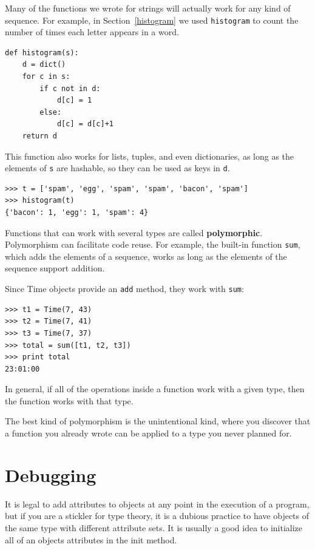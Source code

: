 \documentclass[10pt]{book}
\begin{document}

Many of the functions we wrote for strings will actually
work for any kind of sequence.
For example, in Section~\ref{histogram}
we used {\tt histogram} to count the number of times each letter
appears in a word.

\beforeverb
\begin{verbatim}
def histogram(s):
    d = dict()
    for c in s:
        if c not in d:
            d[c] = 1
        else:
            d[c] = d[c]+1
    return d
\end{verbatim}
\afterverb
%
This function also works for lists, tuples, and even dictionaries,
as long as the elements of {\tt s} are hashable, so they can be used
as keys in {\tt d}.

\beforeverb
\begin{verbatim}
>>> t = ['spam', 'egg', 'spam', 'spam', 'bacon', 'spam']
>>> histogram(t)
{'bacon': 1, 'egg': 1, 'spam': 4}
\end{verbatim}
\afterverb
%
Functions that can work with several types are called {\bf polymorphic}.
Polymorphism can facilitate code reuse.  For example, the built-in
function {\tt sum}, which adds the elements of a sequence, works
as long as the elements of the sequence support addition.


Since Time objects provide an {\tt add} method, they work
with {\tt sum}:

\beforeverb
\begin{verbatim}
>>> t1 = Time(7, 43)
>>> t2 = Time(7, 41)
>>> t3 = Time(7, 37)
>>> total = sum([t1, t2, t3])
>>> print total
23:01:00
\end{verbatim}
\afterverb
%
In general, if all of the operations inside a function 
work with a given type, then the function works with that type.

The best kind of polymorphism is the unintentional kind, where
you discover that a function you already wrote can be
applied to a type you never planned for.


\section{Debugging}

It is legal to add attributes to objects at any point in the execution
of a program, but if you are a stickler for type theory, it is a
dubious practice to have objects of the same type with different
attribute sets.  It is usually a good idea to
initialize all of an objects attributes in the init method.
\end{document}
